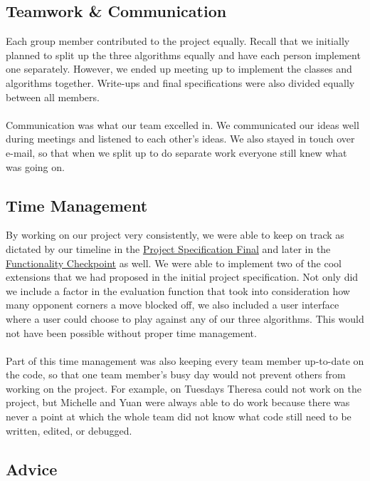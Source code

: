 \documentclass[11pt]{article}
\begin{document}
\subsection{Teamwork \& Communication}

Each group member contributed to the project equally. Recall that we initially planned to split up the three algorithms equally and have each person implement one separately. However, we ended up meeting up to implement the classes and algorithms together. Write-ups and final specifications were also divided equally between all members.
\\\\
Communication was what our team excelled in. We communicated our ideas well during meetings and listened to each other's ideas. We also stayed in touch over e-mail, so that when we split up to do separate work everyone still knew what was going on.

\subsection{Time Management}

By working on our project very consistently, we were able to keep on track as dictated by our timeline in the \href{run:report/Final Project Specification (Final).pdf}{Project Specification Final} and later in the \href{run:report/Functionality_Checkpoint.pdf}{Functionality Checkpoint} as well. We were able to implement two of the cool extensions that we had proposed in the initial project specification. Not only did we include a factor in the evaluation function that took into consideration how many opponent corners a move blocked off, we also included a user interface where a user could choose to play against any of our three algorithms. This would not have been possible without proper time management.
\\\\
Part of this time management was also keeping every team member up-to-date on the code, so that one team member's busy day would not prevent others from working on the project. For example, on Tuesdays Theresa could not work on the project, but Michelle and Yuan were always able to do work because there was never a point at which the whole team did not know what code still need to be written, edited, or debugged.

\subsection{Advice}
\end{document}
